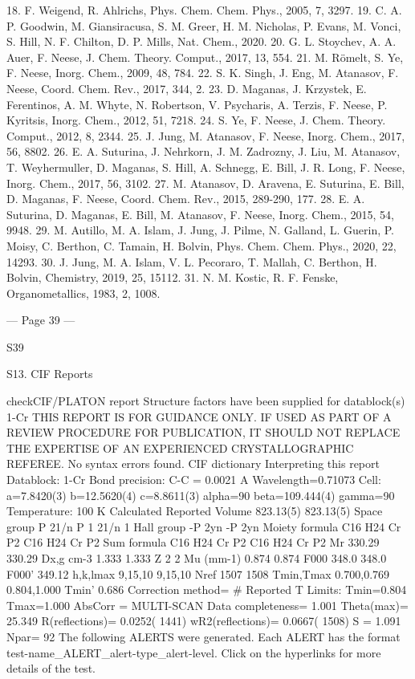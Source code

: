  
18. 
F. Weigend, R. Ahlrichs, Phys. Chem. Chem. Phys., 2005, 7, 3297. 
19. 
C. A. P. Goodwin, M. Giansiracusa, S. M. Greer, H. M. Nicholas, P. Evans, M. Vonci, S. Hill, N. F. 
Chilton, D. P. Mills, Nat. Chem., 2020. 
20. 
G. L. Stoychev, A. A. Auer, F. Neese, J. Chem. Theory. Comput., 2017, 13, 554. 
21. 
M. Römelt, S. Ye, F. Neese, Inorg. Chem., 2009, 48, 784. 
22. 
S. K. Singh, J. Eng, M. Atanasov, F. Neese, Coord. Chem. Rev., 2017, 344, 2. 
23. 
D. Maganas, J. Krzystek, E. Ferentinos, A. M. Whyte, N. Robertson, V. Psycharis, A. Terzis, F. Neese, P. 
Kyritsis, Inorg. Chem., 2012, 51, 7218. 
24. 
S. Ye, F. Neese, J. Chem. Theory. Comput., 2012, 8, 2344. 
25. 
J. Jung, M. Atanasov, F. Neese, Inorg. Chem., 2017, 56, 8802. 
26. 
E. A. Suturina, J. Nehrkorn, J. M. Zadrozny, J. Liu, M. Atanasov, T. Weyhermuller, D. Maganas, S. Hill, 
A. Schnegg, E. Bill, J. R. Long, F. Neese, Inorg. Chem., 2017, 56, 3102. 
27. 
M. Atanasov, D. Aravena, E. Suturina, E. Bill, D. Maganas, F. Neese, Coord. Chem. Rev., 2015, 289-290, 
177. 
28. 
E. A. Suturina, D. Maganas, E. Bill, M. Atanasov, F. Neese, Inorg. Chem., 2015, 54, 9948. 
29. 
M. Autillo, M. A. Islam, J. Jung, J. Pilme, N. Galland, L. Guerin, P. Moisy, C. Berthon, C. Tamain, H. 
Bolvin, Phys. Chem. Chem. Phys., 2020, 22, 14293. 
30. 
J. Jung, M. A. Islam, V. L. Pecoraro, T. Mallah, C. Berthon, H. Bolvin, Chemistry, 2019, 25, 15112. 
31. 
N. M. Kostic, R. F. Fenske, Organometallics, 1983, 2, 1008. 
 
 


--- Page 39 ---
 
 
S39 
 
 
S13. CIF Reports 
 
checkCIF/PLATON report 
Structure factors have been supplied for datablock(s) 1-Cr
THIS REPORT IS FOR GUIDANCE ONLY. IF USED AS PART OF A REVIEW PROCEDURE
FOR PUBLICATION, IT SHOULD NOT REPLACE THE EXPERTISE OF AN EXPERIENCED
CRYSTALLOGRAPHIC REFEREE.
No syntax errors found.        CIF dictionary        Interpreting this report
Datablock: 1-Cr 
Bond precision:
C-C = 0.0021 A
Wavelength=0.71073
Cell:
a=7.8420(3)
b=12.5620(4)
c=8.8611(3)
alpha=90
beta=109.444(4)
gamma=90
Temperature: 
100 K
Calculated
Reported
Volume
823.13(5)
823.13(5)
Space group
P 21/n 
P 1 21/n 1 
Hall group
-P 2yn 
-P 2yn 
Moiety formula
C16 H24 Cr P2
C16 H24 Cr P2
Sum formula
C16 H24 Cr P2
C16 H24 Cr P2
Mr
330.29
330.29
Dx,g cm-3
1.333
1.333
Z
2
2
Mu (mm-1)
0.874
0.874
F000
348.0
348.0
F000’
349.12
h,k,lmax
9,15,10
9,15,10
Nref
1507 
1508 
Tmin,Tmax
0.700,0.769
0.804,1.000
Tmin’
0.686
Correction method= # Reported T Limits: Tmin=0.804 Tmax=1.000
AbsCorr = MULTI-SCAN
Data completeness= 1.001
Theta(max)= 25.349
R(reflections)= 0.0252( 1441)
wR2(reflections)= 0.0667( 1508)
S = 1.091
Npar= 92
The following ALERTS were generated. Each ALERT has the format
       test-name_ALERT_alert-type_alert-level.
Click on the hyperlinks for more details of the test.



